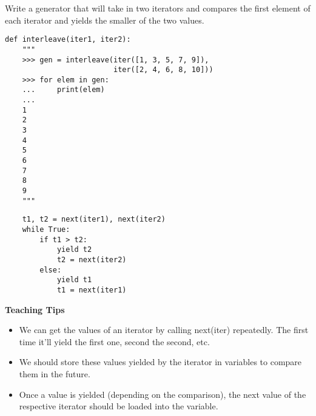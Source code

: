 \begin{blocksection}
\question Write a generator that will take in two iterators and compares the
first element of each iterator and yields the smaller of the two values.

\begin{lstlisting}
def interleave(iter1, iter2):
    """
    >>> gen = interleave(iter([1, 3, 5, 7, 9]),
                         iter([2, 4, 6, 8, 10]))
    >>> for elem in gen:
    ...     print(elem)
    ...
    1
    2
    3
    4
    5
    6
    7
    8
    9
    """
\end{lstlisting}

\begin{solution}[1in]
\begin{lstlisting}
    t1, t2 = next(iter1), next(iter2)
    while True:
        if t1 > t2:
            yield t2
            t2 = next(iter2)
        else:
            yield t1
            t1 = next(iter1)
\end{lstlisting}
\end{solution}
\end{blocksection}

\begin{guide}
\begin{blocksection}
    \textbf{Teaching Tips}
    \begin{itemize}
    \item We can get the values of an iterator by calling next(iter) repeatedly. The first time it'll yield the first one, second the second, etc.
    \item We should store these values yielded by the iterator in variables to compare them in the future.
    \item Once a value is yielded (depending on the comparison), the next value of the respective iterator should be loaded into the variable.
    \end{itemize}
\end{blocksection}
\end{guide}